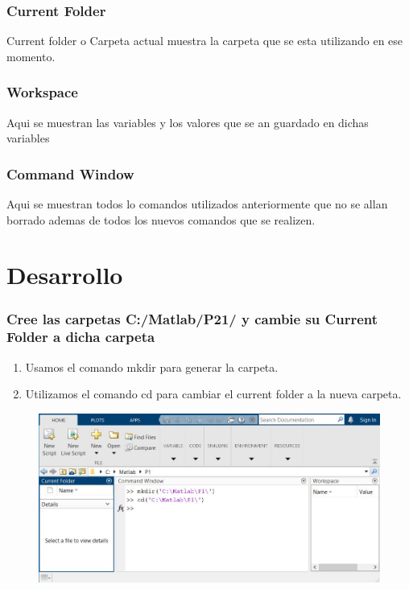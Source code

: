 \documentclass{article}
\begin{document}
\subsubsection{Current Folder}

Current folder o Carpeta actual muestra la carpeta que se esta utilizando en ese momento.

\subsubsection{Workspace}

Aqui se muestran las variables y los valores que se an guardado en dichas variables

\subsubsection{Command Window}

Aqui se muestran todos lo comandos utilizados anteriormente que no se allan borrado ademas de todos los nuevos comandos que se realizen.

\newpage

\section{Desarrollo}

\subsubsection{Cree las carpetas C:/Matlab/P21/ y cambie su Current Folder a dicha carpeta}

\begin{enumerate}
    \item Usamos el comando mkdir para generar la carpeta.
    \item Utilizamos  el comando cd para cambiar el current folder a la nueva carpeta.
\end{enumerate}

\begin{figure}[H]
    \centering
    \includegraphics[width=18cm]{img1.jpg}
\end{figure}
\end{document}
